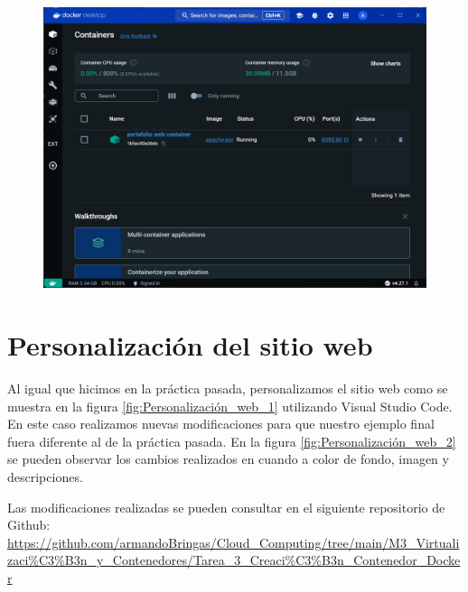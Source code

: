 \documentclass[12pt,a4paper]{article}
\begin{document}
\begin{figure}[H]
    \centering
    \includegraphics[width=1\linewidth]{M3_Virtualización_y_Contenedores/Tarea_3_Creación_Contenedor_Docker/reporte/figuras/4-2_Creación_del_Contenedor.png}
    \label{fig:Creación_Contenedor_2}
\end{figure}


\section{Personalización del sitio web}

Al igual que hicimos en la práctica pasada, personalizamos el sitio web como se muestra en la figura \ref{fig:Personalización_web_1} utilizando Visual Studio Code. En este caso realizamos nuevas modificaciones para que nuestro ejemplo final fuera diferente al de la práctica pasada. En la figura \ref{fig:Personalización_web_2} se pueden observar los cambios realizados en cuando a color de fondo, imagen y descripciones.

Las modificaciones realizadas se pueden consultar en el siguiente repositorio de Github: \url{https://github.com/armandoBringas/Cloud_Computing/tree/main/M3_Virtualizaci%C3%B3n_y_Contenedores/Tarea_3_Creaci%C3%B3n_Contenedor_Docker}
\end{document}
